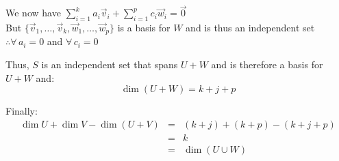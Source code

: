 \documentclass[letterpaper,12pt,fleqn]{article}
\newcommand{\vv}{\vec{v}}
\newcommand{\vw}{\vec{w}}
\newcommand{\vz}{\vec{0}}
\begin{document}
\begin{theproof}
  We now have $\sum_{i=1}^ka_i\vv_i+\sum_{i=1}^pc_i\vw_i=\vz$ \\
  But $\{\vv_1,\ldots,\vv_k,\vw_1,\ldots,\vw_p\}$ is a basis for $W$ and is thus an
  independent set \\
  $\therefore\forall\,a_i=0$ and $\forall\,c_i=0$

  Thus, $S$ is an independent set that spans $U+W$ and is therefore a basis for $U+W$
  and:
  \[\dim(U+W)=k+j+p\]

  Finally:
  \begin{eqnarray*}
    \dim U+\dim V-\dim(U+V) &=& (k+j)+(k+p)-(k+j+p) \\
    &=& k \\
    &=& \dim(U\cup W)
  \end{eqnarray*}
\end{theproof}

\newpage
\end{document}
